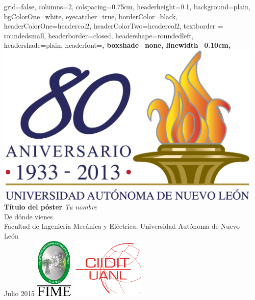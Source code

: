 \documentclass[a0paper, portrait]{baposter}
\begin{document}
\sffamily
\begin{poster}{
    grid=false,
    columns=2,
    colspacing=0.75cm, %
    headerheight=0.1\textheight,
    background=plain,
    bgColorOne=white,
    eyecatcher=true,
    borderColor=black,
    headerColorOne=headercol2,
    headerColorTwo=headercol2,
    textborder = roundedsmall,
    headerborder=closed,
    headershape=roundedleft,
    headershade=plain,
    headerfont=\Large\sffamily\bfseries,
    boxshade=none,
    linewidth=0.10cm,    
}
  { \includegraphics[height=0.1\textheight]{uanl.png} }
  {
    \bf\sf T\'itulo del p\'oster
  }
  {
    {\it Tu nombre} \\
    \small {
    De d\'onde vienes \\
    Facultad de Ingenier\'ia Mec\'anica y El\'ectrica, Universidad Aut\'onoma de Nuevo Le\'on \\
    Julio 2015       
    }
  }
  {
    \includegraphics[height=8.0em]{fime.pdf}
    \hspace{2.0em}
    \includegraphics[height=8.0em]{ciidit.png}
  }


\end{poster}
\end{document}
